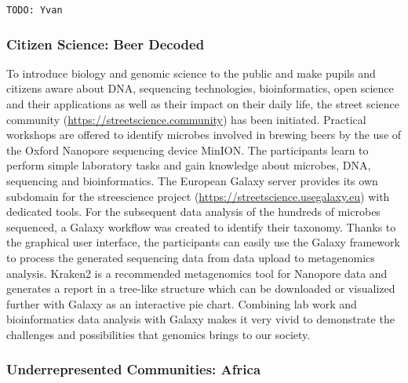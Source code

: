 \documentclass[10pt,letterpaper]{article}
\begin{document}
\verb+TODO: Yvan+

\subsubsection*{Citizen Science: Beer Decoded}

To introduce biology and genomic science to the public and make pupils and citizens aware about DNA, sequencing technologies, bioinformatics, open science and their applications as well as their impact on their daily life, the street science community (\url{https://streetscience.community}) has been initiated.
Practical workshops are offered to identify microbes involved in brewing beers by the use of the Oxford Nanopore sequencing device MinION\@.
The participants learn to perform simple laboratory tasks and gain knowledge about microbes, DNA, sequencing and bioinformatics.
The European Galaxy server provides its own subdomain for the streescience project (\url{https://streetscience.usegalaxy.eu}) with dedicated tools.
For the subsequent data analysis of the hundreds of microbes sequenced, a Galaxy workflow was created to identify their taxonomy.
Thanks to the graphical user interface, the participants can easily use the Galaxy framework to process the generated sequencing data from data upload to  metagenomics analysis.
Kraken2 \cite{wood2019improved} is a recommended metagenomics tool for Nanopore data and generates a report in a tree-like structure which can be downloaded or visualized further with Galaxy as an interactive pie chart.
Combining lab work and bioinformatics data analysis with Galaxy makes it very vivid to demonstrate the challenges and possibilities that genomics brings to our society.


\subsubsection*{Underrepresented Communities: Africa}
\end{document}
